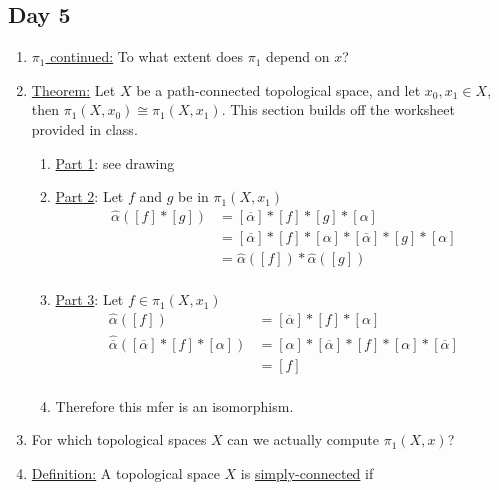\subsection{Day 5}
    \begin{enumerate}
        \item \underline{$\pi_1$ continued:} To what extent does $\pi_1$ depend on $x$?
        \item \underline{Theorem:} Let $X$ be a path-connected topological space, and let $x_0,x_1\in X$, then
            $\pi_1(X,x_0)\cong\pi_1(X,x_1)$. This section builds off the worksheet provided in class.
            \begin{enumerate}
                \item \underline{Part 1}: see drawing
                \item \underline{Part 2}: Let $f$ and $g$ be in $\pi_1(X,x_1)$
                    \begin{align*}
                        \hat{\alpha}([f]*[g])
                        &=[\overline{\alpha}] *[f]*[g] *[\alpha]\\
                        &=[\overline{\alpha}] *[f] *[\alpha] *[\overline{\alpha}] *[g] *[\alpha]\\
                        &=\hat{\alpha}([f])*\hat{\alpha}([g])\\
                    \end{align*}
                \item \underline{Part 3}: Let $f \in \pi_1(X,x_1)$
                    \begin{align*}
                        \hat{\alpha}([f])
                        &=[\overline{\alpha}] *[f] *[\alpha]\\
                        \hat{\overline{\alpha}}( [\overline{\alpha}] *[f] *[\alpha])
                        &=[\alpha] *[\overline{\alpha}] *[f] *[\alpha] *[\overline{\alpha}]\\
                        &=[f]\\
                    \end{align*}
                \item Therefore this mfer is an isomorphism.
            \end{enumerate}
        \item For which topological spaces $X$ can we actually compute $\pi_1(X,x)$?
        \item \underline{Definition:} A topological space $X$ is \underline{simply-connected} if
            \begin{enumerate}

\end{enumerate}
\end{enumerate}
